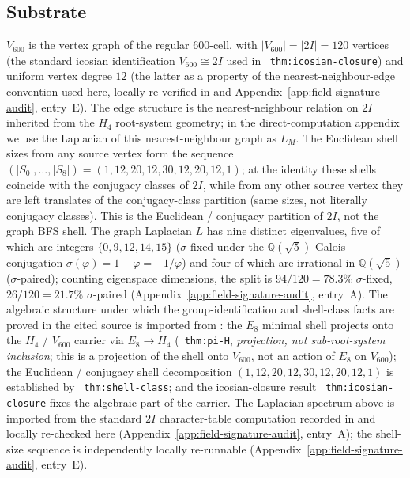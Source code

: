 \documentclass[11pt]{article}
\theoremstyle{definition}
\newcommand{\Q}{\mathbb{Q}}
\newcommand{\pphi}{\varphi}
\newcommand{\Vsub}{V_{600}}
\begin{document}
\subsection{Substrate}

$\Vsub$ is the vertex graph of the regular 600-cell, with $|\Vsub| = |2I| = 120$
vertices (the standard icosian identification
$\Vsub \cong 2I$ used in
\cite{CascadeAlgSubstrate}~\texttt{thm:icosian-closure}) and uniform
vertex degree $12$ (the latter as a property of the
nearest-neighbour-edge convention used here, locally re-verified in
\cite{AriaClosureKernel} and Appendix~\ref{app:field-signature-audit},
entry~E). The edge structure is the nearest-neighbour
relation on $2I$ inherited from the $H_4$ root-system geometry; in the
direct-computation appendix we use the Laplacian of this
nearest-neighbour graph as $L_M$. The Euclidean shell sizes from any
source vertex form the
sequence $(|S_0|, \ldots, |S_8|) = (1, 12, 20, 12, 30, 12, 20, 12, 1)$;
at the identity these shells coincide with the conjugacy classes of
$2I$, while from any other source vertex they are left translates of
the conjugacy-class partition (same sizes, not literally conjugacy
classes). This is the Euclidean / conjugacy partition of $2I$, not
the graph BFS shell. The graph Laplacian $L$ has nine distinct
eigenvalues, five of which are integers $\{0, 9, 12, 14, 15\}$
($\sigma$-fixed under the $\Q(\sqrt{5})$-Galois conjugation
$\sigma(\pphi) = 1 - \pphi = -1/\pphi$) and four of which are
irrational in $\Q(\sqrt{5})$ ($\sigma$-paired); counting eigenspace
dimensions, the split is $94/120 = 78.3\%$ $\sigma$-fixed,
$26/120 = 21.7\%$ $\sigma$-paired
(Appendix~\ref{app:field-signature-audit}, entry~A). The
algebraic structure under which the group-identification and
shell-class facts are proved in the cited source is imported from
\cite{CascadeAlgSubstrate}: the $E_8$ minimal shell projects onto
the $H_4$ / $\Vsub$ carrier via $E_8 \to H_4$
(\cite{CascadeAlgSubstrate}~\texttt{thm:pi-H},
\emph{projection, not sub-root-system inclusion}; this is a projection
of the shell onto $\Vsub$, not an action of $E_8$ on $\Vsub$); the
Euclidean / conjugacy shell decomposition $(1,12,20,12,30,12,20,12,1)$
is established by
\cite{CascadeAlgSubstrate}~\texttt{thm:shell-class}; and the
icosian-closure result \cite{CascadeAlgSubstrate}~\texttt{thm:icosian-closure}
fixes the algebraic part of the carrier. The Laplacian spectrum above
is imported from the standard $2I$ character-table computation
recorded in \cite{CascadeAlgSubstrate} and locally re-checked here
(Appendix~\ref{app:field-signature-audit}, entry~A); the shell-size sequence is independently
locally re-runnable (Appendix~\ref{app:field-signature-audit}, entry~E).
\end{document}
